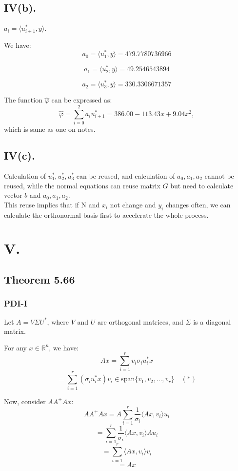 \documentclass[a4paper]{article}
\begin{document}
\subsection*{IV(b).}
\( a_i = \langle u_{i+1}^*, y \rangle \).

We have:
\[
a_0 = \langle u_1^*, y \rangle = 479.7780736966
\]

\[
a_1 = \langle u_2^*, y \rangle = 49.2546543894
\]

\[
a_2 = \langle u_3^*, y \rangle = 330.3306671357
\]

The function \( \hat{\varphi} \) can be expressed as:
\[
\hat{\varphi} = \sum_{i=0}^{2} a_i u_{i+1}^* = 386.00 - 113.43x + 9.04x^2,
\]
which is same as one on notes.

\subsection*{IV(c).}
Calculation of $u_1^*,u_2^*,u_3^*$ can be reused, and calculation of $a_0,a_1,a_2$ cannot be reused, 
while the normal equations can reuse matrix $G$ but need to calculate vector $b$ and $a_0,a_1,a_2$.\\
This reuse implies that if N and $x_i$ not change and $y_i$ changes often, 
we can calculate the orthonormal basis first to accelerate the whole process.

\section*{V.}

\subsection*{Theorem 5.66}

\subsubsection*{PDI-I}
Let \( A = V \Sigma U^* \), where \( V \) and \( U \) are orthogonal matrices, and \( \Sigma \) is a diagonal matrix.

For any \( x \in \mathbb{R}^n \), we have:
\[
Ax = \sum_{i=1}^{r} v_i \sigma_i u_i^* x
\]
\[
= \sum_{i=1}^{r} (\sigma_i u_i^* x) v_i \in \text{span}\{v_1, v_2, \ldots, v_r\}\quad(*)
\]

Now, consider \( AA^+ A x \):
\[
AA^+ A x = A \sum_{i=1}^{r} \frac{1}{\sigma_i} \langle Ax, v_i \rangle u_i
\]
\[
= \sum_{i=1}^{r} \frac{1}{\sigma_i} \langle Ax, v_i \rangle A u_i
\]
\[
= \sum_{i=1}^{r} \langle Ax, v_i \rangle v_i
\]
\[
= Ax
\]
\end{document}
